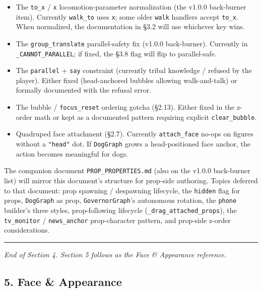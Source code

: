 \documentclass[
  12pt,
  letterpaper,
]{book}
\providecommand{\tightlist}{%
  \setlength{\itemsep}{0pt}\setlength{\parskip}{0pt}}
\begin{document}
\begin{itemize}
\tightlist
\item
  The \texttt{to\_x} / \texttt{x} locomotion-parameter normalization
  (the v1.0.0 back-burner item). Currently \texttt{walk\_to} uses
  \texttt{x}; some older \texttt{walk} handlers accept \texttt{to\_x}.
  When normalized, the documentation in §3.2 will use whichever key
  wins.
\item
  The \texttt{group\_translate} parallel-safety fix (v1.0.0
  back-burner). Currently in \texttt{\_CANNOT\_PARALLEL}; if fixed, the
  §3.8 flag will flip to parallel-safe.
\item
  The \texttt{parallel} + \texttt{say} constraint (currently tribal
  knowledge / refused by the player). Either fixed (head-anchored
  bubbles allowing walk-and-talk) or formally documented with the
  refusal error.
\item
  The bubble / \texttt{focus\_reset} ordering gotcha (§2.13). Either
  fixed in the z-order math or kept as a documented pattern requiring
  explicit \texttt{clear\_bubble}.
\item
  Quadruped face attachment (§2.7). Currently \texttt{attach\_face}
  no-ops on figures without a \texttt{"head"} dot. If \texttt{DogGraph}
  grows a head-positioned face anchor, the action becomes meaningful for
  dogs.
\end{itemize}

The companion document \texttt{PROP\_PROPERTIES.md} (also on the v1.0.0
back-burner list) will mirror this document's structure for prop-side
authoring. Topics deferred to that document: prop spawning / despawning
lifecycle, the \texttt{hidden} flag for props, \texttt{DogGraph} as
prop, \texttt{GovernorGraph}'s autonomous rotation, the \texttt{phone}
builder's three styles, prop-following lifecycle
(\texttt{\_drag\_attached\_props}), the \texttt{tv\_monitor} /
\texttt{news\_anchor} prop-character pattern, and prop-side z-order
considerations.

\begin{center}\rule{0.5\linewidth}{0.5pt}\end{center}

\emph{End of Section 4. Section 5 follows as the Face \& Appearance
reference.}

\subsection{5. Face \& Appearance}\label{face-appearance}
\end{document}
